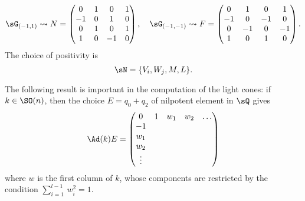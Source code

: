 \begin{equation}
\sG_{(-1,1)}\leadsto N=
\begin{pmatrix}
   0&1&0&1\\
   -1&0&1&0\\
   0&1&0&1\\
   1&0&-1&0
\end{pmatrix},
\quad
\sG_{(-1,-1)}\leadsto F=
\begin{pmatrix}
   0&1&0&1\\
   -1&0&-1&0\\
   0&-1&0&-1\\
   1&0&1&0
\end{pmatrix}.
\end{equation}
The choice of positivity is
\begin{equation}
   \sN=\{V_i,W_j,M,L\}.
\end{equation}

The following result is important in the computation of the light cones: if $k\in \SO(n)$, then the choice $E=q_0+q_2$ of nilpotent element in $\sQ$ gives
\begin{equation} \label{eq:AdkE}
   \Ad(k)E=
\begin{pmatrix}
0&1&w_1&w_2&\ldots\\
-1\\
w_1\\
w_2\\
\vdots
\end{pmatrix}
\end{equation}
where $w$ is the first column of $k$, whose components are restricted by the condition $\sum_{i=1}^{l-1} \, w_i^2=1$.

